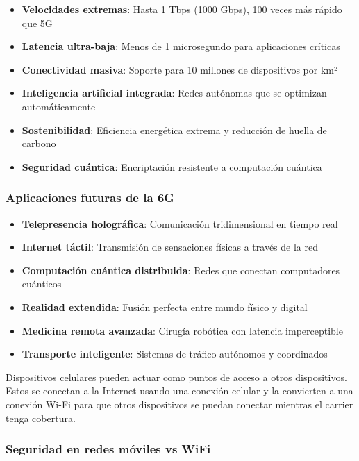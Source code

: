 \begin{itemize}
    \item \textbf{Velocidades extremas}: Hasta 1 Tbps (1000 Gbps), 100 veces más rápido que 5G
    \item \textbf{Latencia ultra-baja}: Menos de 1 microsegundo para aplicaciones críticas
    \item \textbf{Conectividad masiva}: Soporte para 10 millones de dispositivos por km²
    \item \textbf{Inteligencia artificial integrada}: Redes autónomas que se optimizan automáticamente
    \item \textbf{Sostenibilidad}: Eficiencia energética extrema y reducción de huella de carbono
    \item \textbf{Seguridad cuántica}: Encriptación resistente a computación cuántica
\end{itemize}

\subsubsection{Aplicaciones futuras de la 6G}

\begin{itemize}
    \item \textbf{Telepresencia holográfica}: Comunicación tridimensional en tiempo real
    \item \textbf{Internet táctil}: Transmisión de sensaciones físicas a través de la red
    \item \textbf{Computación cuántica distribuida}: Redes que conectan computadores cuánticos
    \item \textbf{Realidad extendida}: Fusión perfecta entre mundo físico y digital
    \item \textbf{Medicina remota avanzada}: Cirugía robótica con latencia imperceptible
    \item \textbf{Transporte inteligente}: Sistemas de tráfico autónomos y coordinados
\end{itemize}
Dispositivos celulares pueden actuar como puntos de acceso a otros dispositivos. Estos se conectan a la Internet usando una conexión celular y la convierten a una conexión Wi-Fi para que otros dispositivos se puedan conectar mientras el carrier tenga cobertura. 

\subsubsection{Seguridad en redes móviles vs WiFi}


